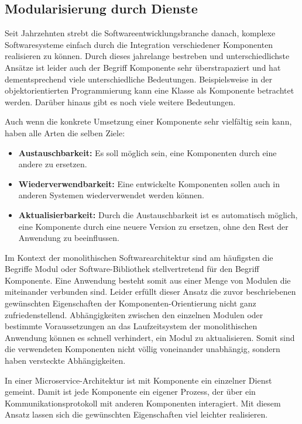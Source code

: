\subsection{Modularisierung durch Dienste}
\label{subsec:Componentization}

Seit Jahrzehnten strebt die Softwareentwicklungsbranche danach, komplexe Softwaresysteme einfach durch die Integration verschiedener Komponenten realisieren zu können. Durch dieses jahrelange bestreben und unterschiedlichste Ansätze ist leider auch der Begriff Komponente sehr überstrapaziert und hat dementsprechend viele unterschiedliche Bedeutungen. Beispielsweise in der objektorientierten Programmierung kann eine Klasse als Komponente betrachtet werden. Darüber hinaus gibt es noch viele weitere Bedeutungen.

Auch wenn die konkrete Umsetzung einer Komponente sehr vielfältig sein kann, haben alle Arten die selben Ziele:

\begin{itemize}
	\item \textbf{Austauschbarkeit:} Es soll möglich sein, eine Komponenten durch eine andere zu ersetzen. 
	\item \textbf{Wiederverwendbarkeit:} Eine entwickelte Komponenten sollen auch in anderen Systemen wiederverwendet werden können.
	\item \textbf{Aktualisierbarkeit:} Durch die Austauschbarkeit ist es automatisch möglich, eine Komponente durch eine neuere Version zu ersetzen, ohne den Rest der Anwendung zu beeinflussen.
\end{itemize}

Im Kontext der monolithischen Softwarearchitektur sind am häufigsten die Begriffe Modul oder Software-Bibliothek stellvertretend für den Begriff Komponente. Eine Anwendung besteht somit aus einer Menge von Modulen die miteinander verbunden sind. Leider erfüllt dieser Ansatz die zuvor beschriebenen gewünschten Eigenschaften der Komponenten-Orientierung nicht ganz zufriedenstellend. Abhängigkeiten zwischen den einzelnen Modulen oder bestimmte Voraussetzungen an das Laufzeitsystem der monolithischen Anwendung können es schnell verhindert, ein Modul zu aktualisieren. Somit sind die verwendeten Komponenten nicht völlig voneinander unabhängig, sondern haben versteckte Abhängigkeiten.

In einer Microservice-Architektur ist mit Komponente ein einzelner Dienst gemeint. Damit ist jede Komponente ein eigener Prozess, der über ein Kommunikationsprotokoll mit anderen Komponenten interagiert. Mit diesem Ansatz lassen sich die gewünschten Eigenschaften viel leichter realisieren.

